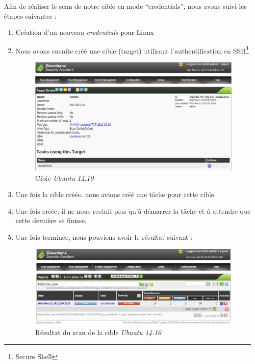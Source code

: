 Afin de réaliser le scan de notre cible en mode \enquote{credentials}, nous avons suivi les étapes suivantes :
\begin{enumerate}
 \item Création d'un nouveau \textit{credentials} pour Linux
 \item Nous avons ensuite créé une cible (target) utilisant l'authentification en SSH\footnote{Secure Shell\cite{SMB}}\\
 \begin{figure}[H]
    \centering
    \includegraphics[width=\textwidth]{img/targetU.png}
    \caption{Cible \textit{Ubuntu 14.10}}
 \end{figure}
 \item Une fois la cible créée, nous avions créé une tâche pour cette cible.
 \item Une fois créée, il ne nous restait plus qu'à démarrer la tâche et à attendre que cette dernière se finisse.
 \item Une fois terminée, nous pouvions avoir le résultat suivant :
 \begin{figure}[H]
    \centering
    \includegraphics[width=\textwidth]{img/repU1.png}
    \caption{Résultat du scan de la cible \textit{Ubuntu 14.10}}
 \end{figure}
\end{enumerate}
